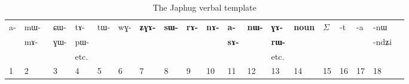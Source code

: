 \documentclass[oldfontcommands,oneside,a4paper,11pt]{article}
\newcommand{\ipab}[1]{{\phon \mbox{#1}}} %
\newcommand{\grise}[1]{\cellcolor{lightgray}\textbf{#1}}
\begin{document}
  \begin{landscape}
\begin{table}[H]
\caption{The Japhug verbal template }\label{tab:template:derivational}
\begin{tabular}{llllll|llllllll|lllll} \toprule
 
\ipab{a-}  &  	\ipab{mɯ- }   &  	\ipab{ɕɯ-}   &\ipab{tɤ-} &  	\ipab{tɯ-}  &  	\ipab{wɣ-}   &

  	 \grise{\ipab{ʑɣɤ-}}  &  	\grise{\ipab{sɯ-}}  & \grise{\ipab{rɤ-}}& \grise{\ipab{nɤ-}} &   	 \grise{\ipab{a-}}   &  	\grise{\ipab{nɯ-}}  &  	\grise{\ipab{ɣɤ-}}  &  	\grise{\ipab{noun}}    &  	 \begin{math}\Sigma\end{math}    &  	\ipab{-t}  &  	\ipab{-a}  &  	\ipab{-nɯ}   &  \\
   &  	\ipab{mɤ-}   &  	\ipab{ɣɯ-}   &\ipab{pɯ-}&  	  &  	 
    & \grise{ }	  &  	 \grise{ }	  &  	  \grise{ }	  &  	   \grise{ }	&  	\grise{\ipab{sɤ-}}&  \grise{ }	 &  	\grise{\ipab{rɯ-}}  &  	 \grise{ }	  &  	  &  	  &  	  &  	\ipab{-ndʑi} &  \\
  &  	   &     &  etc.	  & & 	  &  	  &  	 & &  	  &  	 & &  etc.	  &  	  &  	  &  	  &  	  &  	  &  \\
1  &  	2  &  	3  &  	4  &  	5  &  	6  &  	7  &  	8  &  	9  &  	10  &  	11  &  	12  &  	13  &  	14  &  	15  & 16 &17&18\\
\bottomrule
\end{tabular}
\end{table}
\begin{multicols}{2}
\begin{enumerate}



\end{enumerate}
\end{multicols}
\end{landscape}
\end{document}
